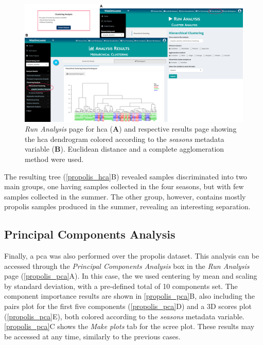 \begin{figure}[H]
	\centering
	\includegraphics[width=1\linewidth]{Imagens/Propolis/hca}
	\caption{\textit{Run Analysis} page for \gls{hca} (\textbf{A}) and respective results page showing the \gls{hca} dendrogram colored according to the \textit{seasons} metadata variable (\textbf{B}). Euclidean distance and a complete agglomeration method were used.}
	\label{propolis_hca}
\end{figure}

The resulting tree (\autoref{propolis_hca}B) revealed samples discriminated into two main groups, one having samples collected in the four seasons, but with few samples collected in the summer. The other group, however, contains mostly propolis samples produced in the summer, revealing an interesting separation.


\subsection{Principal Components Analysis}

Finally, a \gls{pca} was also performed over the propolis dataset. This analysis can be accessed through the \textit{Principal Components Analysis} box in the \textit{Run Analysis} page (\autoref{propolis_pca}A). 
In this case, the we used centering by mean and scaling by standard deviation, with a pre-defined total of 10 components set. The component importance results are shown in \autoref{propolis_pca}B, also including the pairs plot for the first five components (\autoref{propolis_pca}D) and a 3D scores plot (\autoref{propolis_pca}E), both colored according to the \textit{seasons} metadata variable. \autoref{propolis_pca}C shows the \textit{Make plots} tab for the scree plot. These results may be accessed at any time, similarly to the previous cases.

